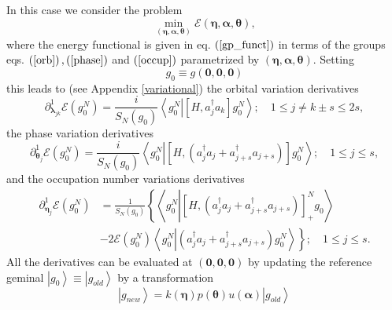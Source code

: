 \documentclass[aps,preprint]{revtex4}%
\begin{document}
In this case we consider the problem
\begin{equation}
\min_{\left(  \bm{\eta,\alpha,\theta}\right)  }\mathcal{E}\left(
\bm{\eta,\alpha,\theta}\right)  ,
\end{equation}
where the energy functional is given in eq. $\left(  \ref{gp_funct}\right)  $
in terms of the groups eqs. $\left(  \ref{orb}\right)  ,\left(  \ref{phase}%
\right)  $ and $\left(  \ref{occup}\right)  $ parametrized by $\left(
\bm{\eta,\alpha,\theta}\right)  $. Setting
\begin{equation}
g_{0}\equiv g\left(  \bm{0,0,0}\right)
\end{equation}
this leads to (see Appendix \ref{variational}) the orbital variation
derivatives
\begin{equation}
\partial_{\bm{\lambda}_{jk}}^{1}\mathcal{E}\left(  g_{0}^{N}\right)  =\frac
{i}{S_{N}\left(  g_{0}\right)  }\left\langle g_{0}^{N}\left\vert \left[
H,a_{j}^{\dagger}a_{k}\right]  g_{0}^{N}\right.  \right\rangle ;\quad1\leq
j\neq k\pm s\leq2s,
\end{equation}
the phase variation derivatives
\begin{equation}
\partial_{\bm{\theta}_{j}}^{1}\mathcal{E}\left(  g_{0}^{N}\right)  =\frac
{i}{S_{N}\left(  g_{0}\right)  }\left\langle g_{0}^{N}\left\vert \left[
H,\left(  a_{j}^{\dagger}a_{j}+a_{j+s}^{\dagger}a_{j+s}\right)  \right]
g_{0}^{N}\right.  \right\rangle ;\quad1\leq j\leq s,
\end{equation}
and the occupation number variations derivatives
\begin{align}
\partial_{\bm{\eta}_{j}}^{1}\mathcal{E}\left(  g_{0}^{N}\right)   &  =\frac
{1}{S_{N}\left(  g_{0}\right)  }\left\{  \left\langle g_{0}^{N}\left\vert
\left[  H,\left(  a_{j}^{\dagger}a_{j}+a_{j+s}^{\dagger}a_{j+s}\right)
\right]  _{+}^{N}g_{0}\right.  \right\rangle \right. \nonumber\\
&  -\left.  2\mathcal{E}\left(  g_{0}^{N}\right)  \left\langle g_{0}%
^{N}\left\vert \left(  a_{j}^{\dagger}a_{j}+a_{j+s}^{\dagger}a_{j+s}\right)
g_{0}^{N}\right.  \right\rangle \right\}  ;\quad1\leq j\leq s.
\end{align}
All the derivatives can be evaluated at $\left(  \bm{0},\bm{0},\bm{0}\right)
$ by updating the reference geminal $\left\vert g_{0}\right\rangle
\equiv\left\vert g_{old}\right\rangle $ by a transformation
\begin{equation}
\left\vert g_{new}\right\rangle =k\left(  \bm{\eta}\right)  p\left(
\bm{\theta}\right)  u\left(  \bm{\alpha}\right)  \left\vert g_{old}%
\right\rangle
\end{equation}
\end{document}
